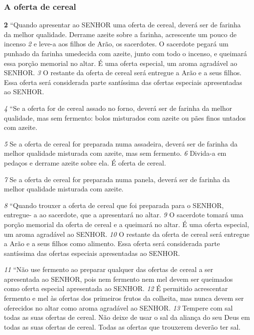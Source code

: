 \bigskip
\subsubsection*{A oferta de cereal}
\textbf{\large 2} “Quando apresentar ao SENHOR uma oferta de cereal, deverá ser de farinha da
melhor qualidade. Derrame azeite sobre a farinha, acrescente um pouco de
incenso 
\textit{\tiny 2} 
e leve-a aos filhos de Arão, os sacerdotes. O sacerdote pegará um
punhado da farinha umedecida com azeite, junto com todo o incenso, e queimará
essa porção memorial no altar. É uma oferta especial, um aroma agradável ao
SENHOR. 
\textit{\tiny 3} 
O restante da oferta de cereal será entregue a Arão e a seus filhos. Essa
oferta será considerada parte santíssima das ofertas especiais apresentadas ao
SENHOR. 

\smallskip
\textit{\tiny 4} 
“Se a oferta for de cereal assado no forno, deverá ser de farinha da melhor
qualidade, mas sem fermento: bolos misturados com azeite ou pães finos untados
com azeite. 

\smallskip
\textit{\tiny 5} 
Se a oferta de cereal for preparada numa assadeira, deverá ser de
farinha da melhor qualidade misturada com azeite, mas sem fermento. 
\textit{\tiny 6} 
Divida-a
em pedaços e derrame azeite sobre ela. É oferta de cereal. 

\smallskip
\textit{\tiny 7} 
Se a oferta de cereal
for preparada numa panela, deverá ser de farinha da melhor qualidade misturada
com azeite. 

\smallskip
\textit{\tiny 8} 
“Quando trouxer a oferta de cereal que foi preparada para o SENHOR, entregue-
a ao sacerdote, que a apresentará no altar. 
\textit{\tiny 9} 
O sacerdote tomará uma porção
memorial da oferta de cereal e a queimará no altar. É uma oferta especial, um
aroma agradável ao SENHOR. 
\textit{\tiny 10}
O restante da oferta de cereal será entregue a Arão
e a seus filhos como alimento. Essa oferta será considerada parte santíssima das
ofertas especiais apresentadas ao SENHOR.
   
\smallskip
\textit{\tiny 11}
“Não use fermento ao preparar qualquer das ofertas de cereal a ser
apresentada ao SENHOR, pois nem fermento nem mel devem ser queimados como
oferta especial apresentada ao SENHOR. 
\textit{\tiny 12}
É permitido acrescentar fermento e mel
às ofertas dos primeiros frutos da colheita, mas nunca devem ser oferecidos no
altar como aroma agradável ao SENHOR. 
\textit{\tiny 13}
Tempere com sal todas as suas ofertas
de cereal. Não deixe de usar o sal da aliança do seu Deus em todas as suas ofertas
de cereal. Todas as ofertas que trouxerem deverão ter sal.

